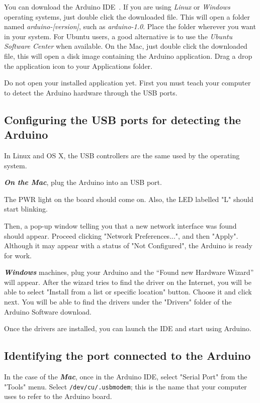 You can download the Arduino IDE~\emph{}. If you are using \emph{Linux} or \emph{Windows} operating systems, just double click the downloaded file. This will open a folder named \emph{arduino-[version]}, such as \emph{arduino-1.0}. Place the folder wherever you want in your system. For Ubuntu users, a good alternative is to use the \emph{Ubuntu Software Center} when available. On the Mac, just double click the downloaded file, this will open a disk image containing the Arduino application. Drag a drop the application icon to your Applications folder.

Do not open your installed application yet. First you must teach your computer to detect the Arduino hardware through the USB ports.

\subsection{Configuring the USB ports for detecting the Arduino}
In Linux and OS X, the USB controllers are the same used by the operating system.

\emph{\bf{On the Mac}}, plug the Arduino into an USB port.

The PWR light on the board should come on. Also, the LED labelled "L" should start blinking.

Then, a pop-up window telling you that a new network interface was found should appear. Proceed clicking "Network Preferences...", and then "Apply". Although it may appear with a status of "Not Configured", the Arduino is ready for work.

\emph{\bf{Windows}} machines, plug your Arduino and the ``Found new Hardware Wizard'' will appear. After the wizard tries to find the driver on the Internet, you will be able to select "Install from a list or specific location" button. Choose it and click next. You will be able to find the drivers under the "Drivers" folder of the Arduino Software download.

Once the drivers are installed, you can launch the IDE and start using Arduino.

\subsection{Identifying the port connected to the Arduino}
In the case of the \emph{\bf{Mac}}, once in the Arduino IDE, select "Serial Port" from the "Tools" menu. Select \texttt{/dev/cu/.usbmodem}; this is the name that your computer uses to refer to the Arduino board.

